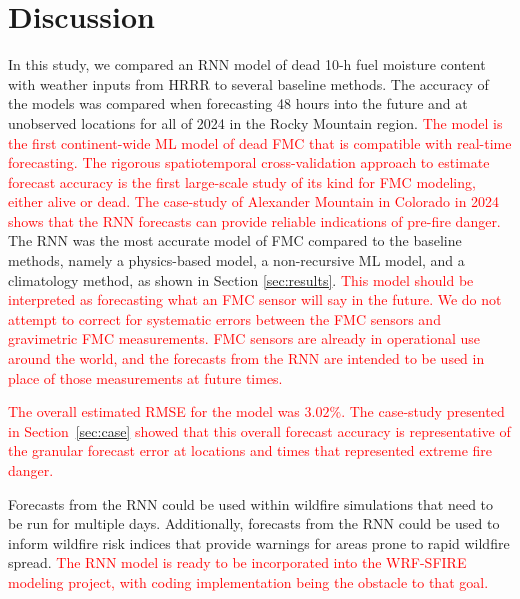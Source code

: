 \documentclass[fire,article,submit,pdftex,moreauthors]{Definitions/mdpi}
\begin{document}
\section{Discussion}
In this study, we compared an RNN model of dead 10-h fuel moisture content with weather inputs from HRRR to several baseline methods. The accuracy of the models was compared when forecasting 48 hours into the future and at unobserved locations for all of 2024 in the Rocky Mountain region. \textcolor{red}{The model is the first continent-wide ML model of dead FMC that is compatible with real-time forecasting. The rigorous spatiotemporal cross-validation approach to estimate forecast accuracy is the first large-scale study of its kind for FMC modeling, either alive or dead. The case-study of Alexander Mountain in Colorado in 2024 shows that the RNN forecasts can provide reliable indications of pre-fire danger.} The RNN was the most accurate model of FMC compared to the baseline methods, namely a physics-based model, a non-recursive ML model, and a climatology method, as shown in Section \ref{sec:results}. \textcolor{red}{This model should be interpreted as forecasting what an FMC sensor will say in the future. We do not attempt to correct for systematic errors between the FMC sensors and gravimetric FMC measurements. FMC sensors are already in operational use around the world, and the forecasts from the RNN are intended to be used in place of those measurements at future times.}

\textcolor{red}{The overall estimated RMSE for the model was $3.02\%$. The case-study presented in Section~\ref{sec:case} showed that this overall forecast accuracy is representative of the granular forecast error at locations and times that represented extreme fire danger.}

Forecasts from the RNN could be used within wildfire simulations that need to be run for multiple days. Additionally, forecasts from the RNN could be used to inform wildfire risk indices that provide warnings for areas prone to rapid wildfire spread. \textcolor{red}{The RNN model is ready to be incorporated into the WRF-SFIRE modeling project, with coding implementation being the obstacle to that goal.}
\end{document}

